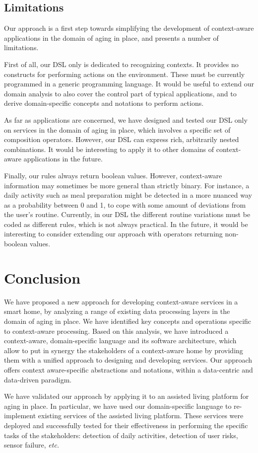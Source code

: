 \subsection*{Limitations}

Our approach is a first step towards simplifying the development of context-aware applications in the domain of aging in place, and presents a number of limitations.

First of all, our DSL only is dedicated to recognizing contexts. It provides no constructs for performing actions on the environment. These must be currently programmed in a generic programming language. It would be useful to extend our domain analysis to also cover the control part of typical applications, and to derive domain-specific concepts and notations to perform actions.

As far as applications are concerned, we have designed and tested our DSL only on services in the domain of aging in place, which involves a specific set of composition operators. However, our DSL can express rich, arbitrarily nested combinations. It would be interesting to apply it to other domains of context-aware applications in the future.

Finally, our rules always return boolean values. However, context-aware information may sometimes be more general than strictly binary. For instance, a daily activity such as meal preparation might be detected in a more nuanced way as a probability between 0 and 1, to cope with some amount of deviations from the user's routine. Currently, in our DSL the different routine variations must be coded as different rules, which is not always practical. In the future, it would be interesting to consider extending our approach with operators returning non-boolean values.

\section{Conclusion}

We have proposed a new approach for developing context-aware services in a smart home, by
analyzing a range of existing data processing layers in the domain of aging in place. We have identified key concepts and operations specific to context-aware processing. Based on this analysis, we have introduced a context-aware, domain-specific language and its software architecture, which allow to put in synergy the stakeholders of a context-aware home by providing them with a unified approach to designing and developing services. Our approach offers context aware-specific abstractions and notations, within a data-centric and data-driven paradigm.

We have validated our approach by applying it to an assisted living platform for aging in place. In particular, we have used our domain-specific language to re-implement existing services of the assisted living platform. These services were deployed and successfully tested for their effectiveness in performing the specific tasks of the stakeholders: detection of daily activities, detection of user risks, sensor failure, {\em etc.}
